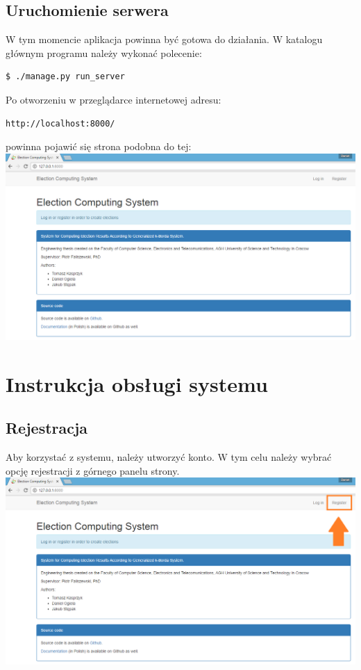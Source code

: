 \documentclass[pdflatex,11pt]{../aghdoc_version2}
\begin{document}
\section{Uruchomienie serwera}
\label{sec:serwer}

W tym momencie aplikacja powinna być gotowa do działania.
W katalogu głównym programu należy wykonać polecenie:
\begin{lstlisting}[language=bash]
$ ./manage.py run_server
\end{lstlisting}

Po otworzeniu w przeglądarce internetowej adresu:
\begin{lstlisting}
http://localhost:8000/
\end{lstlisting}
powinna pojawić się strona podobna do tej: \\ 

\includegraphics[width=1\textwidth]{pics/first_view_version2.png}


\chapter{Instrukcja obsługi systemu}
\label{cha:obsluga}


\section{Rejestracja}
\label{sec:rejestracja}

Aby korzystać z systemu, należy utworzyć konto. W tym celu należy wybrać opcję rejestracji z górnego panelu strony. \\

\includegraphics[width=1\textwidth]{pics/registration_button.png}
\end{document}
